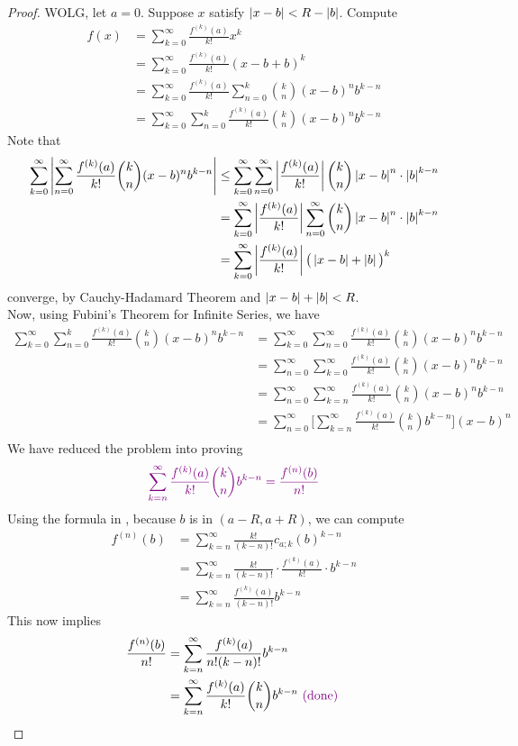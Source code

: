 \documentclass{report}
\begin{document}
\begin{proof}
WOLG, let $a=0$. Suppose $x$ satisfy $\left|x-b\right|<R-\left|b\right|$. Compute 
 \begin{align*}
f(x)&=\sum_{k=0}^{\infty}\frac{f^{(k)}(a)}{k!}x^k\\
&=\sum_{k=0}^{\infty}\frac{f^{(k)}(a)}{k!}(x-b+b)^k\\
&=\sum_{k=0}^{\infty}\frac{f^{(k)}(a)}{k!}\sum_{n=0}^k \binom{k}{n} (x-b)^n b^{k-n}\\
&=\sum_{k=0}^\infty \sum_{n=0}^k \frac{f^{(k)}(a)}{k!}\binom{k}{n}(x-b)^n b^{k-n}
\end{align*}
Note that 
\begin{align*}
  \sum_{k=0}^\infty \left|\sum_{n=0}^\infty \frac{f^{(k)}(a)}{k!}\binom{k}{n}(x-b)^n b^{k-n}\right|&\leq \sum_{k=0}^\infty \sum_{n=0}^\infty \left|\frac{f^{(k)}(a)}{k!}\right|\binom{k}{n}\left|x-b\right|^n \cdot \left|b\right|^{k-n}\\
  &=\sum_{k=0}^{\infty} \left|\frac{f^{(k)}(a)}{k!}\right|\sum_{n=0}^{\infty}\binom{k}{n}\left|x-b\right|^{n}\cdot \left|b\right|^{k-n}\\
  &=\sum_{k=0}^\infty \left|\frac{f^{(k)}(a)}{k!}\right| \big(\left|x-b\right|+\left|b\right| \big)^k
\end{align*}
converge, by Cauchy-Hadamard Theorem and $\left|x-b\right|+\left|b\right|<R$.\\

Now, using Fubini's Theorem for Infinite Series, we have 
\begin{align*}
\sum_{k=0}^\infty \sum_{n=0}^{k} \frac{f^{(k)}(a)}{k!}\binom{k}{n}(x-b)^{n}b^{k-n}&=\sum_{k=0}^\infty \sum_{n=0}^{\infty} \frac{f^{(k)}(a)}{k!} \binom{k}{n}(x-b)^n b^{k-n}\\
&=\sum_{n=0}^\infty \sum_{k=0}^\infty \frac{f^{(k)}(a)}{k!} \binom{k}{n}(x-b)^n b^{k-n}\\
&=\sum_{n=0}^\infty \sum_{k=n}^\infty \frac{f^{(k)}(a)}{k!} \binom{k}{n}(x-b)^n b^{k-n}\\
&=\sum_{n=0}^\infty \Big[ \sum_{k=n}^\infty \frac{f^{(k)}(a)}{k!} \binom{k}{n}b^{k-n}\Big] (x-b)^n\\
\end{align*}
We have reduced the problem into proving 
\begin{align*}
\textcolor{violet}{\sum_{k=n}^\infty \frac{f^{(k)}(a)}{k!} \binom{k}{n}b^{k-n}=\frac{f^{(n)}(b)}{n!}}
\end{align*}
Using the formula in , because $b$ is in $(a-R,a+R)$, we can compute 
\begin{align*}
f^{(n)}(b)&=\sum_{k=n}^{\infty}\frac{k!}{(k-n)!}c_{a;k}(b)^{k-n}\\
&=\sum_{k=n}^\infty \frac{k!}{(k-n)!} \cdot \frac{f^{(k)}(a)}{k!} \cdot b^{k-n}\\
&=\sum _{k=n}^{\infty}\frac{f^{(k)}(a)}{(k-n)!}b^{k-n}
\end{align*}
This now implies 
\begin{align*}
\frac{f^{(n)}(b)}{n!}&=\sum_{k=n}^\infty \frac{f^{(k)}(a)}{n!(k-n)!}b^{k-n}\\
&=\sum_{k=n}^\infty \frac{f^{(k)}(a)}{k!}\binom{k}{n}b^{k-n}\textcolor{violet}{\text{ (done) }}
\end{align*}

\end{proof}
\end{document}
